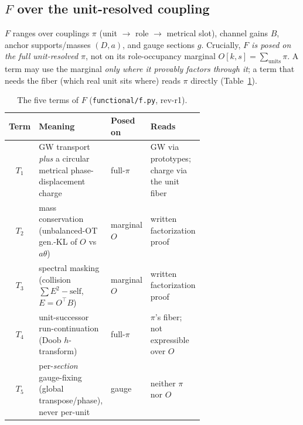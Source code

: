 \documentclass[11pt]{article}
\newcommand{\code}[1]{\texttt{\small #1}}
\begin{document}
\subsection{$F$ over the unit-resolved coupling}

$F$ ranges over couplings $\pi$ (unit $\rightarrow$ role $\rightarrow$ metrical
slot), channel gains $B$, anchor supports/masses $(D,a)$, and gauge sections $g$.
Crucially, \emph{$F$ is posed on the full unit-resolved $\pi$}, not on its
role-occupancy marginal $O[k,s]=\sum_{\text{units}}\pi$. A term may use the
marginal \emph{only where it provably factors through it}; a term that needs the
fiber (which real unit sits where) reads $\pi$ directly (Table~\ref{tab:terms}).

\begin{table}[htbp]
\centering
\caption{The five terms of $F$ (\code{functional/f.py}, rev-r1).}
\label{tab:terms}
\small
\begin{tabular}{@{}c >{\raggedright\arraybackslash}p{0.37\linewidth}
  l >{\raggedright\arraybackslash}p{0.29\linewidth}@{}}
\toprule
Term & Meaning & Posed on & Reads \\
\midrule
$T_1$ & GW transport \emph{plus} a circular metrical phase-displacement charge
      & full-$\pi$ & GW via prototypes; charge via the unit fiber \\
$T_2$ & mass conservation (unbalanced-OT gen.-KL of $O$ vs $a\theta$)
      & marginal $O$ & written factorization proof \\
$T_3$ & spectral masking (collision $\sum E^2-\text{self}$, $E=O^\top B$)
      & marginal $O$ & written factorization proof \\
$T_4$ & unit-successor run-continuation (Doob $h$-transform)
      & full-$\pi$ & $\pi$'s fiber; not expressible over $O$ \\
$T_5$ & per-\emph{section} gauge-fixing (global transpose/phase), never per-unit
      & gauge & neither $\pi$ nor $O$ \\
\bottomrule
\end{tabular}
\end{table}
\end{document}

